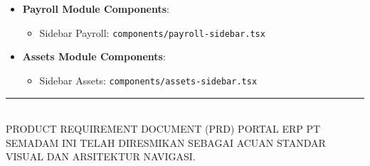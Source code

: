 \documentclass[11pt,a4paper]{article}
\begin{document}
\begin{itemize}
\begin{itemize}
    \end{itemize}
    \item \textbf{Payroll Module Components}:
    \begin{itemize}
        \item Sidebar Payroll: \texttt{components/payroll-sidebar.tsx}
    \end{itemize}
    \item \textbf{Assets Module Components}:
    \begin{itemize}
        \item Sidebar Assets: \texttt{components/assets-sidebar.tsx}
    \end{itemize}
\end{itemize}

\vspace{2cm}

\begin{center}
    \rule{8cm}{0.5pt}\\
    \small\color{gray}PRODUCT REQUIREMENT DOCUMENT (PRD) PORTAL ERP PT SEMADAM INI TELAH DIRESMIKAN SEBAGAI ACUAN STANDAR VISUAL DAN ARSITEKTUR NAVIGASI.
\end{center}
\end{document}
